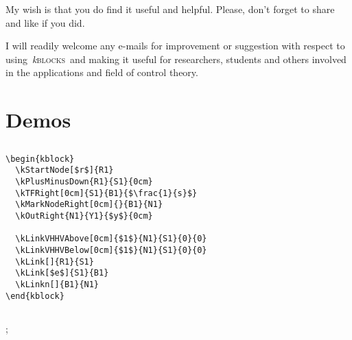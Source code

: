 \documentclass[onecolumn,a4paper,10pt]{IEEEtran}
\newcommand*{\kblocks}{\relax~\textit{k}\textsc{blocks}}
\newcommand*{\spacetweak}{\medskip\medskip}
\begin{document}
My wish is that you do find it useful and helpful. Please, don't forget to share and like if you did.

I will readily welcome any e-mails for improvement or suggestion with respect to
using\kblocks~and making it useful for researchers, students and others involved in the applications and field of control theory.

\centering

\section{Demos}
\subsection{}\spacetweak
\begin{kblock}

\end{kblock}

\begin{lstlisting}
\begin{kblock}
  \kStartNode[$r$]{R1}
  \kPlusMinusDown{R1}{S1}{0cm}
  \kTFRight[0cm]{S1}{B1}{$\frac{1}{s}$}
  \kMarkNodeRight[0cm]{}{B1}{N1}
  \kOutRight{N1}{Y1}{$y$}{0cm}

  \kLinkVHHVAbove[0cm]{$1$}{N1}{S1}{0}{0}
  \kLinkVHHVBelow[0cm]{$1$}{N1}{S1}{0}{0}
  \kLink[]{R1}{S1}
  \kLink[$e$]{S1}{B1}
  \kLinkn[]{B1}{N1}
\end{kblock}
\end{lstlisting}


\spacetweak

\subsection{}\spacetweak
\begin{kblock}


  ;
\end{kblock}
\end{document}
